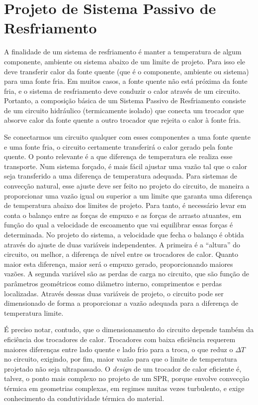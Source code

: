 \documentclass[a4paper,portuguese,10pt]{article}
\begin{document}
\section{Projeto de Sistema Passivo de Resfriamento\label{sec_projeto}}

A finalidade de um sistema de resfriamento é manter a temperatura de algum componente, ambiente ou sistema abaixo de um limite de projeto. Para isso ele deve transferir calor da fonte quente (que é o componente, ambiente ou sistema) para uma fonte fria. Em muitos casos, a fonte quente não está próxima da fonte fria, e o sistema de resfriamento deve conduzir o calor através de um circuito. Portanto, a composição básica de um Sistema Passivo de Resfriamento consiste de um circuito hidráulico (termicamente isolado) que conecta um trocador que absorve calor da fonte quente a outro trocador que rejeita o calor à fonte fria. 

Se conectarmos um circuito qualquer com esses componentes a uma fonte quente e uma fonte fria, o circuito certamente transferirá o calor gerado pela fonte quente. O ponto relevante é a que diferença de temperatura ele realiza esse transporte. Num sistema forçado, é mais fácil ajustar uma vazão tal que o calor seja transferido a uma diferença de temperatura adequada. Para sistemas de convecção natural, esse ajuste deve ser feito no projeto do circuito, de maneira a proporcionar uma vazão igual ou superior a um limite que garanta uma diferença de temperatura abaixo dos limites de projeto. Para tanto, é necessário levar em conta o balanço entre as forças de empuxo e as forças de arrasto atuantes, em função do qual a velocidade de escoamento que vai equilibrar essas forças é determinada. No projeto do sistema, a velocidade que fecha o balanço é obtida através do ajuste de duas variáveis independentes. A primeira é a ``altura'' do circuito, ou melhor, a diferença de nível entre os trocadores de calor. Quanto maior esta diferença, maior será o empuxo gerado, proporcionando maiores vazões. A segunda variável são as perdas de carga no circuito, que são função de parâmetros geométricos como diâmetro interno, comprimentos e perdas localizadas. Através dessas duas variáveis de projeto, o circuito pode ser dimensionado de forma a proporcionar a vazão adequada para a diferença de temperatura limite.

É preciso notar, contudo, que o dimensionamento do circuito depende também da eficiência dos trocadores de calor. Trocadores com baixa eficiência requerem maiores diferenças entre lado quente e lado frio para a troca, o que reduz o $\Delta T$ no circuito, exigindo, por fim, maior vazão para que o limite de temperatura projetado não seja ultrapassado. O {\it design} de um trocador de calor eficiente é, talvez, o ponto mais complexo no projeto de um SPR, porque envolve convecção térmica em geometrias complexas, em regimes muitas vezes turbulento, e exige conhecimento da condutividade térmica do material.
\end{document}
